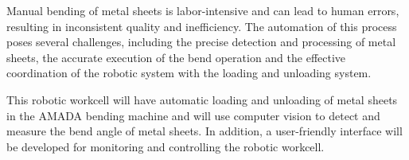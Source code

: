 Manual bending of metal sheets is labor-intensive and can 
lead to human errors, resulting in inconsistent quality
and inefficiency. The automation of this process poses
several challenges, including the precise detection and
processing of metal sheets, the accurate execution of
the bend operation and the effective coordination of
the robotic system with the loading and unloading system.

This robotic workcell will have automatic loading and unloading
of metal sheets in the AMADA bending machine and will use
computer vision to detect
and measure the bend angle of metal sheets.
In addition, a user-friendly interface will be developed for
monitoring and controlling the robotic workcell.